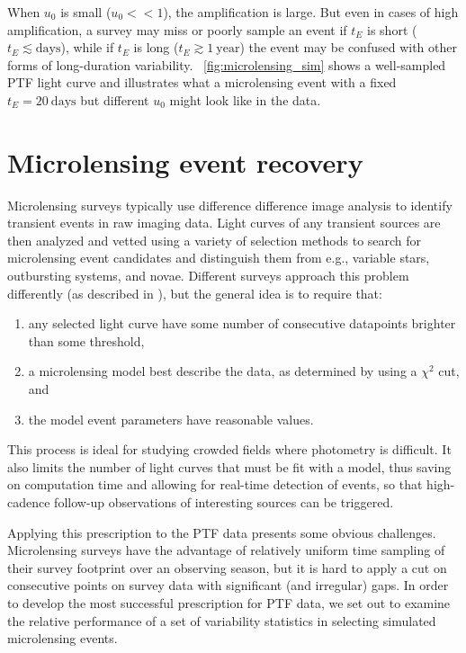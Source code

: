 \documentclass{emulateapj}
\begin{document}
When $u_0$ is small ($u_0<<1$), the amplification is large. But even in cases of high amplification, a survey may miss or poorly sample an event if $t_E$ is short ($t_E \lesssim\mathrm{days}$), while if $t_E$ is long ($t_E \gtrsim 1~\mathrm{year}$) the event may be confused with other forms of long-duration variability. \figurename~\ref{fig:microlensing_sim} shows a well-sampled PTF light curve and illustrates what a microlensing event with a fixed $t_E=20~\mathrm{days}$ but different $u_0$ might look like in the data.

\section{Microlensing event recovery} \label{sec:event_recovery}
Microlensing surveys typically use difference difference image analysis \citep{alard1998} to identify transient events in raw imaging data. Light curves of any transient sources are then analyzed and vetted using a variety of selection methods to search for microlensing event candidates and distinguish them from e.g., variable stars, outbursting systems, and novae. Different surveys approach this problem differently (as described in \citealt{ogle_optical_depth, con_idx, alcock2000, macho_detection_efficiency, hamadache2009, wyrzykowski2009, sumi2011}), but the general idea is to require that: 

\begin{enumerate}
	\item any selected light curve have some number of consecutive datapoints brighter than some threshold,
	\item a microlensing model best describe the data, as determined by using a $\chi^2$ cut, and
	\item the model event parameters have reasonable values.
\end{enumerate}

This process is ideal for studying crowded fields where photometry is difficult. It also limits the number of light curves that must be fit with a model, thus saving on computation time and allowing for real-time detection of events, so that high-cadence follow-up observations of interesting sources can be triggered. 

Applying this prescription to the PTF data presents some obvious challenges. Microlensing surveys have the advantage of relatively uniform time sampling of their survey footprint over an observing season, but it is hard to apply a cut on consecutive points on survey data with significant (and irregular) gaps. In order to develop the most successful prescription for PTF data, we set out to examine the relative performance of a set of variability statistics in selecting simulated microlensing events.
\end{document}
